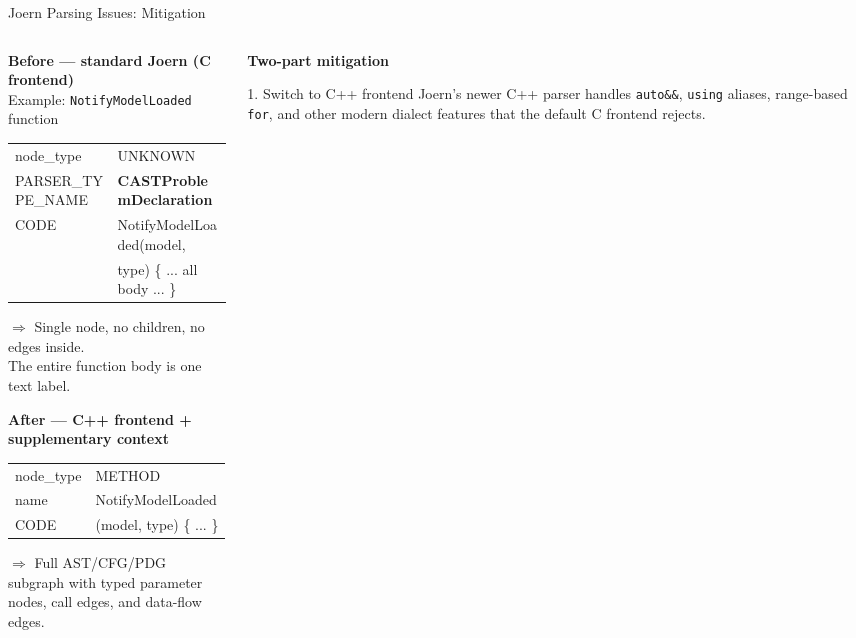 \documentclass[aspectratio=169,10pt]{beamer}
\begin{document}
\begin{frame}{Joern Parsing Issues: Mitigation}
\begin{columns}[T]
\begin{column}{0.50\textwidth}

  \textbf{Before — standard Joern (C frontend)}\\[2pt]
  Example: \texttt{NotifyModelLoaded} function

  \vspace{0.3em}
  {\scriptsize\ttfamily\color{miss!70!black}
  \begin{tabular}{ll}
    node\_type & UNKNOWN \\
    PARSER\_TYPE\_NAME & \textbf{CASTProblemDeclaration} \\
    CODE & NotifyModelLoaded(model, \\
          & \quad type) \{ ... all body ... \}
  \end{tabular}}

  \vspace{0.3em}
  {\scriptsize\color{black!50}
  $\Rightarrow$ Single node, no children, no edges inside.\\
  The entire function body is one text label.}

  \vspace{0.7em}
  \textbf{After — C++ frontend + supplementary context}\\[2pt]

  \vspace{0.3em}
  {\scriptsize\ttfamily\color{hit!70!black}
  \begin{tabular}{ll}
    node\_type & METHOD \\
    name & NotifyModelLoaded \\
    CODE & (model, type) \{ ... \}
  \end{tabular}}

  \vspace{0.3em}
  {\scriptsize\color{black!50}
  $\Rightarrow$ Full AST/CFG/PDG subgraph with typed parameter\\
  nodes, call edges, and data-flow edges.}

\end{column}
\begin{column}{0.47\textwidth}

  \textbf{Two-part mitigation}

  \vspace{0.4em}
  \begin{block}{1. Switch to C++ frontend}
    \scriptsize Joern's newer C++ parser handles \texttt{auto\&\&},
    \texttt{using} aliases, range-based \texttt{for}, and other
    modern dialect features that the default C frontend rejects.
  \end{block}


\end{column}
\end{columns}
\end{frame}
\end{document}
